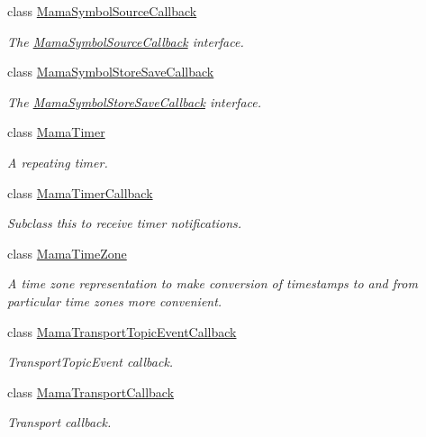 \begin{DoxyCompactItemize}
class \hyperlink{classWombat_1_1MamaSymbolSourceCallback}{MamaSymbolSourceCallback}
\begin{DoxyCompactList}\small\item\em The \hyperlink{classWombat_1_1MamaSymbolSourceCallback}{MamaSymbolSourceCallback} interface. \item\end{DoxyCompactList}\item 
class \hyperlink{classWombat_1_1MamaSymbolStoreSaveCallback}{MamaSymbolStoreSaveCallback}
\begin{DoxyCompactList}\small\item\em The \hyperlink{classWombat_1_1MamaSymbolStoreSaveCallback}{MamaSymbolStoreSaveCallback} interface. \item\end{DoxyCompactList}\item 
class \hyperlink{classWombat_1_1MamaTimer}{MamaTimer}
\begin{DoxyCompactList}\small\item\em A repeating timer. \item\end{DoxyCompactList}\item 
class \hyperlink{classWombat_1_1MamaTimerCallback}{MamaTimerCallback}
\begin{DoxyCompactList}\small\item\em Subclass this to receive timer notifications. \item\end{DoxyCompactList}\item 
class \hyperlink{classWombat_1_1MamaTimeZone}{MamaTimeZone}
\begin{DoxyCompactList}\small\item\em A time zone representation to make conversion of timestamps to and from particular time zones more convenient. \item\end{DoxyCompactList}\item 
class \hyperlink{classWombat_1_1MamaTransportTopicEventCallback}{MamaTransportTopicEventCallback}
\begin{DoxyCompactList}\small\item\em TransportTopicEvent callback. \item\end{DoxyCompactList}\item 
class \hyperlink{classWombat_1_1MamaTransportCallback}{MamaTransportCallback}
\begin{DoxyCompactList}\small\item\em Transport callback. \item\end{DoxyCompactList}\item 

\end{DoxyCompactItemize}
